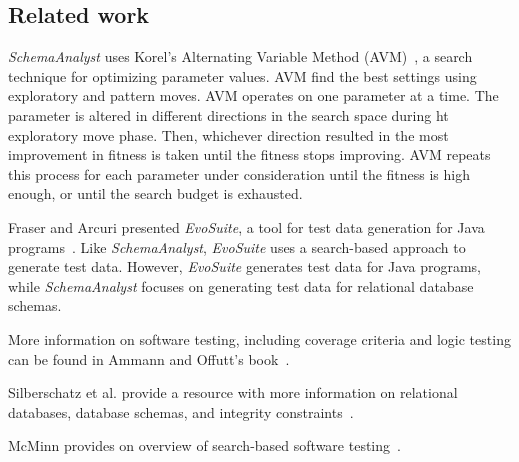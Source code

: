 \subsection{Related work}
\textit{SchemaAnalyst} uses Korel's Alternating Variable Method (AVM)~\cite{Korel:AVM},
a search technique for optimizing parameter values. AVM find the best settings using 
exploratory and pattern moves. AVM operates on one parameter at a time. The parameter is
altered in different directions in the search space during ht exploratory move phase.  Then,
whichever direction resulted in the most improvement in fitness is taken until the fitness stops 
improving. AVM repeats this process for each parameter under consideration until the fitness is
high enough, or until the search budget is exhausted.

Fraser and Arcuri presented \textit{EvoSuite}, a tool for test data generation for
Java programs~\cite{Fraser2011evosuite}.
Like \textit{SchemaAnalyst}, \textit{EvoSuite} uses a search-based approach 
to generate test data. However, \textit{EvoSuite} generates test data for Java programs, while
\textit{SchemaAnalyst} focuses on generating test data for relational database schemas.

More information on software testing, including coverage criteria and logic testing
can be found in Ammann and Offutt's book~\cite{ammann2008}.

Silberschatz et al. provide a resource with more information on relational databases,
database schemas, and integrity constraints~\cite{databasebook}.

McMinn provides on overview of search-based software testing~\cite{STVR:STVR294}.
